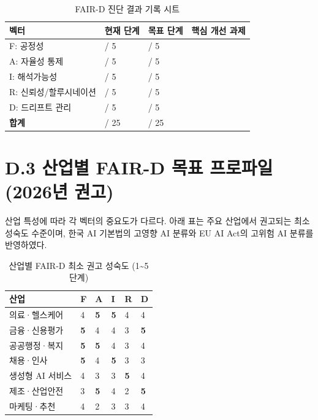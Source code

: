 \begin{table}[htbp]
\centering
\caption{FAIR-D 진단 결과 기록 시트}
\label{tab:faird_scoresheet}
\begin{tabularx}{\textwidth}{|l|l|l|X|}
\hline
\textbf{벡터} & \textbf{현재 단계} & \textbf{목표 단계} & \textbf{핵심 개선 과제} \\ \hline
F: 공정성 & \hspace{1.5cm} / 5 & \hspace{1.5cm} / 5 & \\ \hline
A: 자율성 통제 & \hspace{1.5cm} / 5 & \hspace{1.5cm} / 5 & \\ \hline
I: 해석가능성 & \hspace{1.5cm} / 5 & \hspace{1.5cm} / 5 & \\ \hline
R: 신뢰성/할루시네이션 & \hspace{1.5cm} / 5 & \hspace{1.5cm} / 5 & \\ \hline
D: 드리프트 관리 & \hspace{1.5cm} / 5 & \hspace{1.5cm} / 5 & \\ \hline
\textbf{합계} & \hspace{1.5cm} / 25 & \hspace{1.5cm} / 25 & \\ \hline
\end{tabularx}
\end{table}

\section*{D.3 산업별 FAIR-D 목표 프로파일 (2026년 권고)}

산업 특성에 따라 각 벡터의 중요도가 다르다. 아래 표는 주요 산업에서 권고되는 최소 성숙도 수준이며, 한국 AI 기본법의 고영향 AI 분류와 EU AI Act의 고위험 AI 분류를 반영하였다.

\begin{table}[htbp]
\centering
\caption{산업별 FAIR-D 최소 권고 성숙도 (1\textasciitilde{}5단계)}
\label{tab:faird_industry}
\begin{tabularx}{\textwidth}{|l|l|l|l|l|l|}
\hline
\textbf{산업} & \textbf{F} & \textbf{A} & \textbf{I} & \textbf{R} & \textbf{D} \\ \hline
의료·헬스케어 & 4 & \textbf{5} & \textbf{5} & 4 & 4 \\ \hline
금융·신용평가 & \textbf{5} & 4 & 4 & 3 & \textbf{5} \\ \hline
공공행정·복지 & \textbf{5} & \textbf{5} & 4 & 3 & 4 \\ \hline
채용·인사 & \textbf{5} & 4 & \textbf{5} & 3 & 3 \\ \hline
생성형 AI 서비스 & 4 & 3 & 3 & \textbf{5} & 4 \\ \hline
제조·산업안전 & 3 & \textbf{5} & 4 & 2 & \textbf{5} \\ \hline
마케팅·추천 & 4 & 2 & 3 & 3 & 4 \\ \hline
\end{tabularx}
\end{table}

